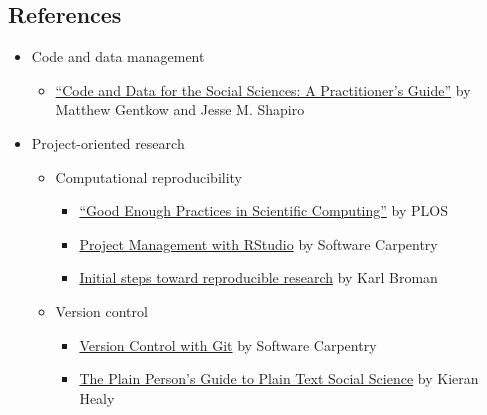 \documentclass[
  letterpaper,
  DIV=11,
  numbers=noendperiod]{scrreprt}
\providecommand{\tightlist}{%
  \setlength{\itemsep}{0pt}\setlength{\parskip}{0pt}}\usepackage{longtable,booktabs,array}
\begin{document}
\hypertarget{references-1}{%
\subsection*{References}\label{references-1}}

\begin{itemize}
\item
  Code and data management

  \begin{itemize}
  \tightlist
  \item
    \href{https://web.stanford.edu/~gentzkow/research/CodeAndData.pdf}{``Code
    and Data for the Social Sciences: A Practitioner's Guide''} by
    Matthew Gentkow and Jesse M. Shapiro
  \end{itemize}
\item
  Project-oriented research

  \begin{itemize}
  \item
    Computational reproducibility

    \begin{itemize}
    \item
      \href{https://GitHub.com/swcarpentry/good-enough-practices-in-scientific-computing/blob/gh-pages/good-enough-practices-for-scientific-computing.pdf}{``Good
      Enough Practices in Scientific Computing''} by PLOS
    \item
      \href{https://swcarpentry.GitHub.io/r-novice-gapminder/02-project-intro/}{Project
      Management with RStudio} by Software Carpentry
    \item
      \href{https://kbroman.org/steps2rr/}{Initial steps toward
      reproducible research} by Karl Broman
    \end{itemize}
  \item
    Version control

    \begin{itemize}
    \item
      \href{https://swcarpentry.GitHub.io/git-novice/}{Version Control
      with Git} by Software Carpentry
    \item
      \href{http://plain-text.co/}{The Plain Person's Guide to Plain
      Text Social Science} by Kieran Healy
    \end{itemize}
  \end{itemize}
\end{itemize}

\end{document}
